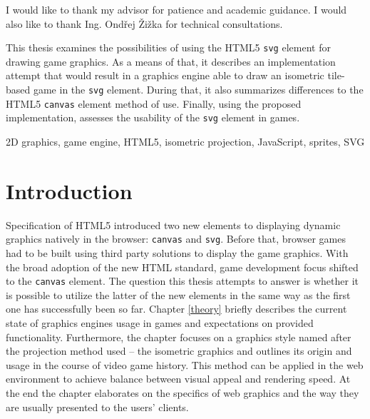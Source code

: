 \documentclass[11pt,oneside, final]{fithesis2}
\begin{document}
  
\FrontMatter  
\ThesisTitlePage  
 
\begin{ThesisDeclaration}  
\DeclarationText  
\AdvisorName  
\end{ThesisDeclaration}  
 
\begin{ThesisThanks}  
I would like to thank my advisor for patience and academic guidance. I would also like to thank Ing. Ondřej Žižka for technical consultations.
\end{ThesisThanks}  
 
\begin{ThesisAbstract}  
This thesis examines the possibilities of using the HTML5 \texttt{svg} element for drawing game graphics. As a means of that, it describes an implementation attempt that would result in a graphics engine able to draw an isometric tile-based game in the \texttt{svg} element. During that, it also summarizes differences to the HTML5 \texttt{canvas} element method of use. Finally, using the proposed implementation, assesses the usability of the \texttt{svg} element in games.
\end{ThesisAbstract}  
 
\begin{ThesisKeyWords}  
2D graphics, game engine, HTML5, isometric projection, JavaScript, sprites, SVG
\end{ThesisKeyWords}  
 
\MainMatter
 
\tableofcontents          %
 
\chapter{Introduction}
Specification of HTML5 introduced two new elements to displaying dynamic graphics natively in the browser: \texttt{canvas} and \texttt{svg}\cite{w3_html5}. Before that, browser games had to be built using third party solutions to display the game graphics\cite{pagella}. With the broad adoption of the new HTML standard, game development focus shifted to the \texttt{canvas} element\cite{pagella}. The question this thesis attempts to answer is whether it is possible to utilize the latter of the new elements in the same way as the first one has successfully been so far. Chapter \ref{theory} briefly describes the current state of graphics engines usage in games and expectations on provided functionality. Furthermore, the chapter focuses on a graphics style named after the projection method used -- the isometric graphics and outlines its origin and usage in the course of video game history. This method can be applied in the web environment to achieve balance between visual appeal and rendering speed. At the end the chapter elaborates on the specifics of web graphics and the way they are usually presented to the users' clients.
\end{document}
